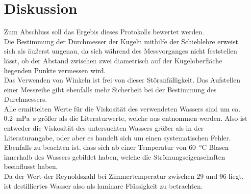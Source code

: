 
\section{Diskussion}
Zum Abschluss soll das Ergebis dieses Protokolls bewertet werden.\\
Die Bestimmung der Durchmesser der Kugeln mithilfe der Schieblehre erweist sich als äußerst ungenau, da sich während des Messvorganges nicht feststellen lässt, ob der Abstand zwischen zwei diametrisch auf der Kugeloberfläche liegenden Punkte vermessen wird.\\
Das Verwenden von Winkeln ist frei von dieser Störanfälligkeit. Das Aufstellen einer Messreihe gibt ebenfalls mehr Sicherheit bei der Bestimmung des Durchmessers.\\
Alle ermittelten Werte für die Viskosität des verwendeten Wassers sind um ca. \SI{0.2}{\milli\pascal\second} größer als die Literaturwerte, welche aus \textcite{demtroeder-1} entnommen werden. Also ist entweder die Viskosität des untersuchten Wassers größer als in der Literaturangabe, oder aber es handelt sich um einen systematischen Fehler. Ebenfalls zu beachten ist, dass sich ab einer Temperatur von \SI{60}{\celsius} Blasen innerhalb des Wassers gebildet haben, welche die Strömungseigenschaften beeinflusst haben.\\
Da der Wert der Reynoldszahl bei Zimmertemperatur zwischen 29 und 96 liegt, ist destilliertes Wasser also als laminare Flüssigkeit zu betrachten.